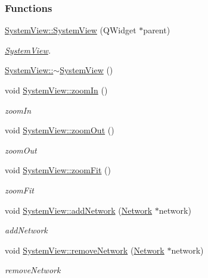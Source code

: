 \subsubsection*{Functions}
\begin{DoxyCompactItemize}
\item 
\hyperlink{group___graphics_ga660a455ff7b98cb92410b0bf1cbb2eeb}{System\+View\+::\+System\+View} (Q\+Widget $\ast$parent)
\begin{DoxyCompactList}\small\item\em \hyperlink{class_system_view}{System\+View}. \end{DoxyCompactList}\item 
\hyperlink{group___graphics_ga0091352981c1efa5498819b69698db44}{System\+View\+::$\sim$\+System\+View} ()
\item 
void \hyperlink{group___graphics_ga93170319ee5fbf9098353b383fc8a368}{System\+View\+::zoom\+In} ()
\begin{DoxyCompactList}\small\item\em zoom\+In \end{DoxyCompactList}\item 
void \hyperlink{group___graphics_gaf971471c76265ec21cdde2aafe9b609f}{System\+View\+::zoom\+Out} ()
\begin{DoxyCompactList}\small\item\em zoom\+Out \end{DoxyCompactList}\item 
void \hyperlink{group___graphics_gac1bf0b6a80216df74a8da1cb8ac5f0e8}{System\+View\+::zoom\+Fit} ()
\begin{DoxyCompactList}\small\item\em zoom\+Fit \end{DoxyCompactList}\item 
void \hyperlink{group___graphics_gae183447d0777c7b2b940a977f9b64c3f}{System\+View\+::add\+Network} (\hyperlink{class_network}{Network} $\ast$network)
\begin{DoxyCompactList}\small\item\em add\+Network \end{DoxyCompactList}\item 
void \hyperlink{group___graphics_ga2078ad08ff93b9a8683d567e3f9f714e}{System\+View\+::remove\+Network} (\hyperlink{class_network}{Network} $\ast$network)
\begin{DoxyCompactList}\small\item\em remove\+Network \end{DoxyCompactList}\item 

\end{DoxyCompactItemize}
